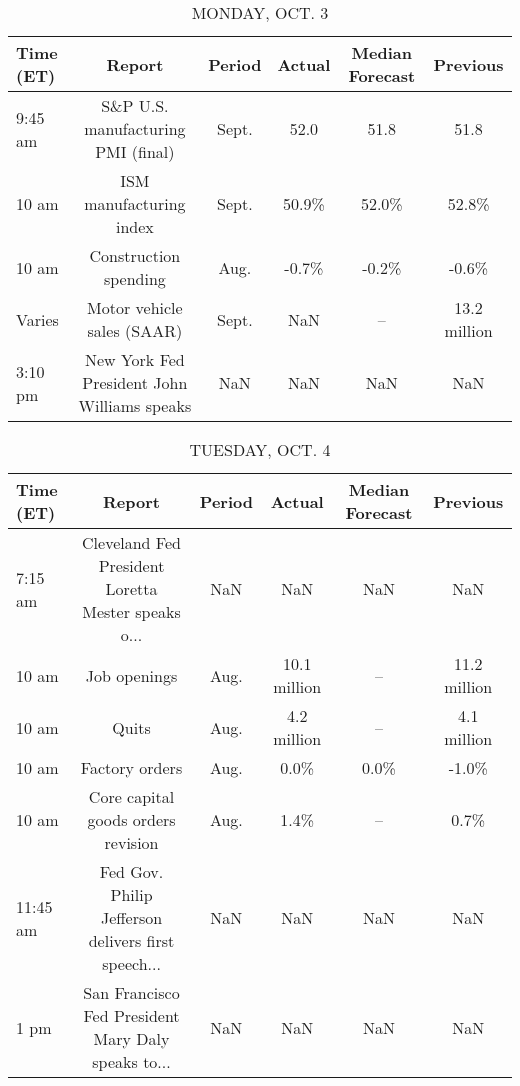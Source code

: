 \documentclass{article}%
\begin{document}
%
\normalsize%


\begin{table}[htbp]%
\caption{MONDAY, OCT. 3}%
\centering%
\begin{adjustbox}{width=1\textwidth}%
\begin{tabular}{lccccc}
\toprule
Time (ET) &                                      Report & Period & Actual & Median Forecast &     Previous \\
\midrule
  9:45 am &          S\&P U.S. manufacturing PMI (final) &  Sept. &   52.0 &            51.8 &         51.8 \\
    10 am &                     ISM manufacturing index &  Sept. &  50.9\% &           52.0\% &        52.8\% \\
    10 am &                       Construction spending &   Aug. &  -0.7\% &           -0.2\% &        -0.6\% \\
   Varies &                  Motor vehicle sales (SAAR) &  Sept. &    NaN &              -- & 13.2 million \\
  3:10 pm & New York Fed President John Williams speaks &    NaN &    NaN &             NaN &          NaN \\
\bottomrule
\end{tabular}
%
\end{adjustbox}%
\end{table}

%


\begin{table}[htbp]%
\caption{TUESDAY, OCT. 4}%
\centering%
\begin{adjustbox}{width=1\textwidth}%
\begin{tabular}{lccccc}
\toprule
Time (ET) &                                             Report & Period &       Actual & Median Forecast &     Previous \\
\midrule
  7:15 am & Cleveland Fed President Loretta Mester speaks o... &    NaN &          NaN &             NaN &          NaN \\
    10 am &                                       Job openings &   Aug. & 10.1 million &              -- & 11.2 million \\
    10 am &                                              Quits &   Aug. &  4.2 million &              -- &  4.1 million \\
    10 am &                                     Factory orders &   Aug. &         0.0\% &            0.0\% &        -1.0\% \\
    10 am &                 Core capital goods orders revision &   Aug. &         1.4\% &              -- &         0.7\% \\
 11:45 am & Fed Gov. Philip Jefferson delivers first speech... &    NaN &          NaN &             NaN &          NaN \\
     1 pm & San Francisco Fed President Mary Daly speaks to... &    NaN &          NaN &             NaN &          NaN \\
\bottomrule
\end{tabular}
%
\end{adjustbox}%
\end{table}
\end{document}

